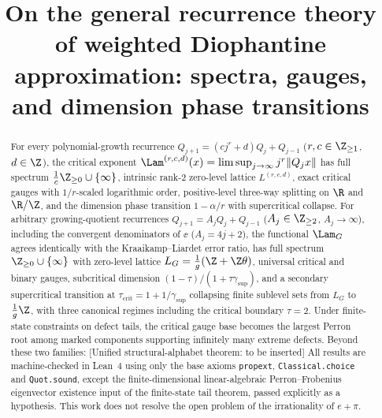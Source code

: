 \title{On the general recurrence theory of weighted Diophantine approximation:
spectra, gauges, and dimension phase transitions}


\maketitle

\begin{abstract}
For every polynomial-growth recurrence $Q_{j+1}=(cj^r+d)Q_j+Q_{j-1}$
($r,c\in\Z_{\ge1}$, $d\in\Z$), the critical exponent
$\Lam^{(r,c,d)}(x)=\limsup_{j\to\infty}j^r\|Q_jx\|$ has full spectrum
$\frac1c\Z_{\ge0}\cup\{\infty\}$, intrinsic rank-$2$ zero-level lattice
$L^{(r,c,d)}$, exact critical gauges with $1/r$-scaled logarithmic order,
positive-level three-way splitting on $\R$ and $\R/\Z$, and the dimension
phase transition $1-\alpha/r$ with supercritical collapse. For arbitrary
growing-quotient recurrences $Q_{j+1}=A_jQ_j+Q_{j-1}$ ($A_j\in\Z_{\ge2}$,
$A_j\to\infty$), including the convergent denominators of $\ee$
($A_j=4j+2$), the functional $\Lam_G$ agrees identically with the
Kraaikamp--Liardet error ratio, has full spectrum $\Z_{\ge0}\cup\{\infty\}$
with zero-level lattice $L_G=\frac1g(\Z+\Z\theta)$, universal critical and
binary gauges, subcritical dimension $(1-\tau)/(1+\tau\gamma_{\sup})$, and a
secondary supercritical transition at $\tau_{\mathrm{crit}}=1+1/\gamma_{\sup}$
collapsing finite sublevel sets from $L_G$ to $\frac1g\Z$, with three
canonical regimes including the critical boundary $\tau=2$. Under
finite-state constraints on defect tails, the critical gauge base becomes the
largest Perron root among marked components supporting infinitely many extreme
defects. Beyond these two families:
[Unified structural-alphabet theorem: to be inserted]
All results are machine-checked in Lean~4 using only the base axioms
\texttt{propext}, \texttt{Classical.choice} and \texttt{Quot.sound}, except
the finite-dimensional linear-algebraic Perron--Frobenius eigenvector
existence input of the finite-state tail theorem, passed explicitly as a
hypothesis.
This work does not resolve the open problem of the irrationality of $e+\pi$.
\end{abstract}

